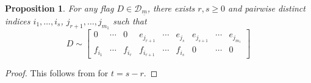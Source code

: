 \documentclass[pdftex]{sigma}
\numberwithin{equation}{section}
\newtheorem{Proposition}[Theorem]{Proposition}
\theoremstyle{definition}
\newcommand{\D}{\mathcal{D}}
\theoremstyle{plain}
\theoremstyle{plain}
\theoremstyle{plain}
\theoremstyle{plain}
\begin{document}
\begin{Proposition}{\label{normal form exist}}
	For any flag $D \in \D_{\underline m}$, there exists $r,s \geqslant 0$ and pairwise distinct indices $i_1, \dots, i_{s}$, $j_{r+1}, \dots, j_{m_1}$ such that
	\begin{equation*}
		D \sim \begin{bmatrix}
		0 & \cdots & 0  & e_{j_{r+1}} & \cdots & e_{j_{s}} & e_{j_{s+1}} & \cdots & e_{j_{m_1}} \\
		f_{i_1} & \cdots & f_{i_{r}}  & f_{i_{r+1}} & \cdots & f_{i_s} & 0 & \cdots & 0
	\end{bmatrix}
	\end{equation*}
\end{Proposition}
\begin{proof}
	This follows from  for $t = s-r$.
\end{proof}
\end{document}

